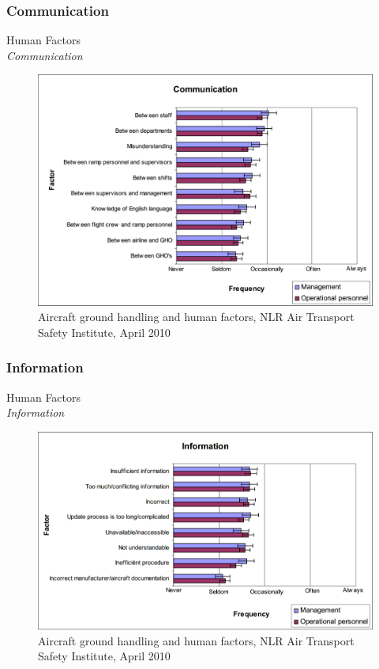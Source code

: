 \subsubsection{Communication}
\begin{frame}{Human Factors\\\textit{Communication}}{}
	\begin{figure}[H]
	\centering
	\includegraphics[width=\textwidth]{Grafik/CommunicationalFactors}
	\caption{\footnotesize Aircraft ground handling and human factors, NLR Air Transport Safety Institute, April 2010}
\end{figure}
\end{frame}

\subsubsection{Information}
\begin{frame}{Human Factors\\\textit{Information}}{}
	\begin{figure}[H]
	\centering
	\includegraphics[width=\textwidth]{Grafik/Information}
	\caption{\footnotesize Aircraft ground handling and human factors, NLR Air Transport Safety Institute, April 2010}
\end{figure}
\end{frame}

